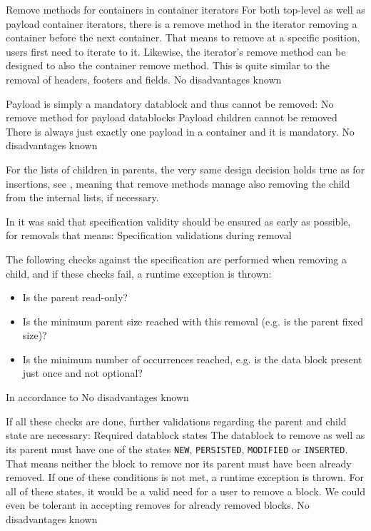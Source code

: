 {%
Remove methods for containers in container iterators
}
{%
For both top-level as well as payload container iterators, there is a remove method in the iterator removing a container before the next container. That means to remove at a specific position, users first need to iterate to it. Likewise, the iterator's remove method can be designed to also the container remove method. 
}
{%
This is quite similar to the removal of headers, footers and fields.
}
{%
No disadvantages known
}

Payload is simply a mandatory datablock and thus cannot be removed:
{%
No remove method for payload datablocks
}
{%
Payload children cannot be removed
}
{%
There is always just exactly one payload in a container and it is mandatory.
}
{%
No disadvantages known
}

For the lists of children in parents, the very same design decision holds true as for insertions, see , meaning that remove methods manage also removing the child from the internal lists, if necessary.

In  it was said that specification validity should be ensured as early as possible, for removals that means:
{%
Specification validations during removal
}
{%
The following checks against the specification are performed when removing a child, and if these checks fail, a runtime exception is thrown:
\begin{itemize}
\item Is the parent read-only?
\item Is the minimum parent size reached with this removal (e.g. is the parent fixed size)?
\item Is the minimum number of occurrences reached, e.g. is the data block present just once and not optional?
\end{itemize}
}
{%
In accordance to 
}
{%
No disadvantages known
}

If all these checks are done, further validations regarding the parent and child state are necessary:
{%
Required datablock states
}
{%
The datablock to remove as well as its parent must have one of the states \texttt{NEW}, \texttt{PERSISTED}, \texttt{MODIFIED} or \texttt{INSERTED}. That means neither the block to remove nor its parent must have been already removed. If one of these conditions is not met, a runtime exception is thrown.
}
{%
For all of these states, it would be a valid need for a user to remove a block. We could even be tolerant in accepting removes for already removed blocks.
}
{%
No disadvantages known
}

